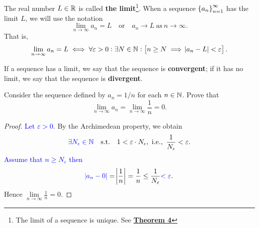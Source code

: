 \documentclass[11pt,openany]{article}
\begin{document}
\newpage
{}
\begin{remark*}
	The real number $L\in\mathbb{R}$ is called \textbf{the limit}\footnote{The limit of a sequence is unique. See \hyperlink{thm4}{\textbf{Theorem 4}}}. When a sequence $\set{a_n}_{n=1}^\infty$ has the limit $L$, we will use the notation \[
	\lim_{n\to\infty}a_n=L\quad\text{or}\quad a_n\to L\ \text{as}\ n\to\infty.
	\]  That is, \[
		\lim_{n\to\infty}a_n=L\iff \forall\varepsilon>0:\exists N\in\mathbb{N}:\left[ n\geq N\implies \abs{a_n-L}<\varepsilon\right].
	\]
\end{remark*}

\begin{note}
	If a sequence has a limit, we say that the sequence is \textbf{convergent}; if it has no limit, we say that the sequence is \textbf{divergent}.
\end{note}

\vfill
\begin{example*}
	Consider the sequence defined by $a_n=1/n$ for each $n\in\mathbb{N}$. Prove that \[
	\lim\limits_{n\to\infty}a_n=\lim\limits_{n\to\infty}\frac{1}{n}=0.
	\]
	\begin{center}
		
	\end{center}
	\begin{proof}
		\textcolor{blue}{Let $\varepsilon>0$}. By the Archimedean property, we obtain \[
		\textcolor{blue}{\exists N_\epsilon\in\N}\quad \text{s.t.}\quad 1<\varepsilon\cdot N_\epsilon,\ \ie,\ \frac{1}{N_\epsilon}<\varepsilon.
		\] \textcolor{blue}{Assume that $n\geq N_\varepsilon$ then} \[
		\textcolor{blue}{\abs{a_n-0}}=\abs{\frac{1}{n}}=\frac{1}{n}\leq\frac{1}{N_\varepsilon}
		\textcolor{blue}{<\varepsilon}.
		\] Hence $\displaystyle\lim\limits_{n\to\infty}\frac{1}{n}=0$.
	\end{proof}
\end{example*}
\end{document}
